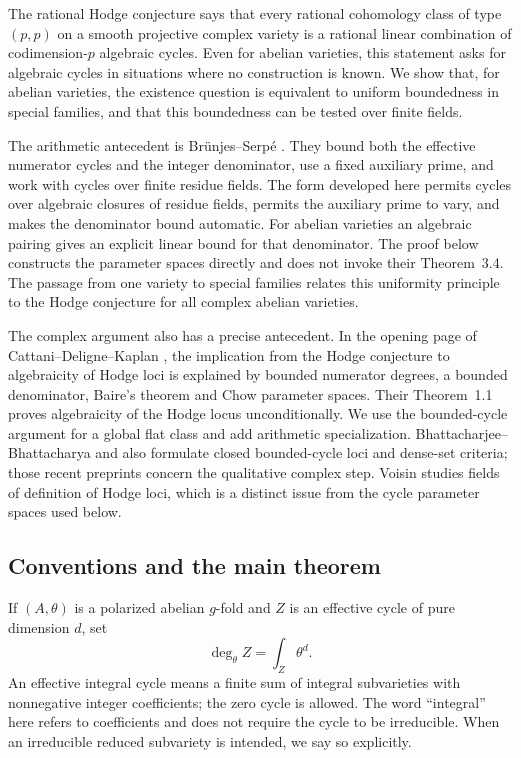 \documentclass[11pt]{article}
\theoremstyle{definition}
\theoremstyle{remark}
\begin{document}
The rational Hodge conjecture says that every rational cohomology class of type $(p,p)$ on a smooth projective complex variety is a rational linear combination of codimension-$p$ algebraic cycles. Even for abelian varieties, this statement asks for algebraic cycles in situations where no construction is known. We show that, for abelian varieties, the existence question is equivalent to uniform boundedness in special families, and that this boundedness can be tested over finite fields.

The arithmetic antecedent is Br\"unjes--Serp\'e \cite[Definition 2.3(ii), p.~4; Theorem 3.4, p.~8]{BS}. They bound both the effective numerator cycles and the integer denominator, use a fixed auxiliary prime, and work with cycles over finite residue fields. The form developed here permits cycles over algebraic closures of residue fields, permits the auxiliary prime to vary, and makes the denominator bound automatic. For abelian varieties an algebraic pairing gives an explicit linear bound for that denominator. The proof below constructs the parameter spaces directly and does not invoke their Theorem~3.4. The passage from one variety to special families relates this uniformity principle to the Hodge conjecture for all complex abelian varieties.

The complex argument also has a precise antecedent. In the opening page of Cattani--Deligne--Kaplan \cite[p.~483]{CDK}, the implication from the Hodge conjecture to algebraicity of Hodge loci is explained by bounded numerator degrees, a bounded denominator, Baire's theorem and Chow parameter spaces. Their Theorem~1.1 proves algebraicity of the Hodge locus unconditionally. We use the bounded-cycle argument for a global flat class and add arithmetic specialization. Bhattacharjee--Bhattacharya \cite[Lemmas~4.2--4.3 and Theorem~4.5]{BBDense} and \cite[Theorems~16.9 and 16.17]{BBAlgebraic} also formulate closed bounded-cycle loci and dense-set criteria; those recent preprints concern the qualitative complex step. Voisin \cite[Propositions~0.2 and 0.5, Theorem~0.6]{Voisin07} studies fields of definition of Hodge loci, which is a distinct issue from the cycle parameter spaces used below.

\subsection{Conventions and the main theorem}

If $(A,\theta)$ is a polarized abelian $g$-fold and $Z$ is an effective cycle of pure dimension $d$, set
\[
 \deg_\theta Z=\int_Z\theta^d.
\]
An effective integral cycle means a finite sum of integral subvarieties with nonnegative integer coefficients; the zero cycle is allowed. The word ``integral'' here refers to coefficients and does not require the cycle to be irreducible. When an irreducible reduced subvariety is intended, we say so explicitly.
\end{document}
